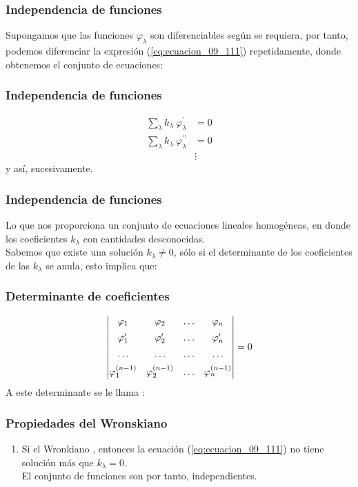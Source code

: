 \documentclass[12pt]{beamer}
\begin{document}
\begin{frame}
\frametitle{Independencia de funciones}
Supongamos que las funciones $\varphi_{\lambda}$ son diferenciables según se requiera, \pause por tanto, podemos diferenciar la expresión (\ref{eq:ecuacion_09_111}) repetidamente, donde obtenemos el conjunto de ecuaciones:
\end{frame}
\begin{frame}
\frametitle{Independencia de funciones}
\begin{align}
\sum_{\lambda} k_{\lambda} \: \varphi^{\prime}_{\lambda} &= 0 \label{eq:ecuacion_09_114} \\[0.5em]
\sum_{\lambda} k_{\lambda} \: \varphi^{\prime \prime}_{\lambda} &= 0 \label{eq:ecuacion_09_115} \\[0.5em]
&\vdots \nonumber
\end{align}
y así, sucesivamente.
\end{frame}
\begin{frame}
\frametitle{Independencia de funciones}
Lo que nos proporciona un conjunto de ecuaciones lineales homogéneas, en donde los coeficientes $k_{\lambda}$ con cantidades desconocidas. 
\\
\bigskip
\pause
Sabemos que existe una solución $k_{\lambda} \neq 0$, sólo si el determinante de los coeficientes de las $k_{\lambda}$ se anula, esto implica que:
\end{frame}
\begin{frame}
\frametitle{Determinante de coeficientes}
\begin{align}
\mdet{
\varphi_{1} & \varphi_{2} & \ldots & \varphi_{n} \\[0.5em]
\varphi^{\prime}_{1} & \varphi^{\prime}_{2} & \ldots & \varphi^{\prime}_{n} \\[0.5em]
\ldots & \ldots & \ldots & \ldots \\[0.5em]
\varphi^{(n-1)}_{1} & \varphi^{(n-1)}_{2} & \ldots & \varphi^{(n-1)}_{n} \\
} = 0
\label{eq:ecuacion_09_116}
\end{align}
A este determinante se le llama :
\end{frame}
\begin{frame}
\frametitle{Propiedades del Wronskiano}
\begin{enumerate}
\item Si el Wronkiano , entonces la ecuación (\ref{eq:ecuacion_09_111}) no tiene solución más que $k_{\lambda} = 0$.
\\
El conjunto de funciones son por tanto, independientes.
\seti
\end{enumerate}
\end{frame}
\end{document}
